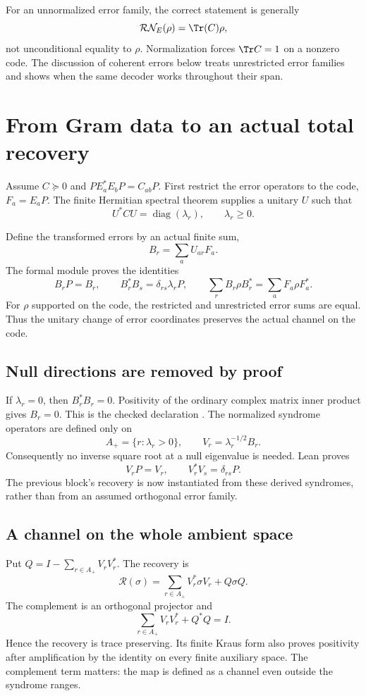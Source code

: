 For an unnormalized error family, the correct statement is generally
\[
\mathcal R\mathcal N_E(\rho)=\Tr(C)\rho,
\]
not unconditional equality to $\rho$. Normalization forces $\Tr C=1$ on a nonzero code. The discussion of coherent errors below treats unrestricted error families and shows when the same decoder works throughout their span.



\section{From Gram data to an actual total recovery}\label{supp5:section:002}
Assume $C\succeq0$ and $PE_a^*E_bP=C_{ab}P$. First restrict the error operators to the code, $F_a=E_aP$. The finite Hermitian spectral theorem supplies a unitary $U$ such that
\[
U^*CU=\operatorname{diag}(\lambda_r),\qquad \lambda_r\ge0.
\]


Define the transformed errors by an actual finite sum,
\[
B_r=\sum_a U_{ar}F_a.
\]
The formal module proves the identities
\[
B_rP=B_r,\qquad B_r^*B_s=\delta_{rs}\lambda_rP,
\qquad \sum_rB_r\rho B_r^*=\sum_aF_a\rho F_a^*.
\]
For $\rho$ supported on the code, the restricted and unrestricted error sums are equal. Thus the unitary change of error coordinates preserves the actual channel on the code.

\subsection{Null directions are removed by proof}
If $\lambda_r=0$, then $B_r^*B_r=0$. Positivity of the ordinary complex matrix inner product gives $B_r=0$. This is the checked declaration . The normalized syndrome operators are defined only on
\[
A_+=\{r:\lambda_r>0\},\qquad V_r=\lambda_r^{-1/2}B_r.
\]
Consequently no inverse square root at a null eigenvalue is needed. Lean proves
\[
V_rP=V_r,\qquad V_r^*V_s=\delta_{rs}P.
\]
The previous block's recovery is now instantiated from these derived syndromes, rather than from an assumed orthogonal error family.

\subsection{A channel on the whole ambient space}
Put $Q=I-\sum_{r\in A_+}V_rV_r^*$. The recovery is
\[
\boxed{\mathcal R(\sigma)=\sum_{r\in A_+}V_r^*\sigma V_r+Q\sigma Q.}
\]
The complement is an orthogonal projector and
\[
\sum_{r\in A_+}V_rV_r^*+Q^*Q=I.
\]
Hence the recovery is trace preserving. Its finite Kraus form also proves positivity after amplification by the identity on every finite auxiliary space. The complement term matters: the map is defined as a channel even outside the syndrome ranges.

